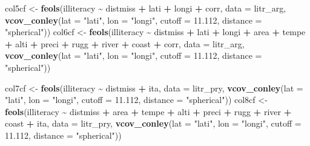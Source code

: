\documentclass[
  a4paper,
]{article}
\newenvironment{Shaded}{\begin{snugshade}}{\end{snugshade}}
\newcommand{\AttributeTok}[1]{\textcolor[rgb]{0.13,0.29,0.53}{#1}}
\newcommand{\FloatTok}[1]{\textcolor[rgb]{0.00,0.00,0.81}{#1}}
\newcommand{\FunctionTok}[1]{\textcolor[rgb]{0.13,0.29,0.53}{\textbf{#1}}}
\newcommand{\NormalTok}[1]{#1}
\newcommand{\OtherTok}[1]{\textcolor[rgb]{0.56,0.35,0.01}{#1}}
\newcommand{\SpecialCharTok}[1]{\textcolor[rgb]{0.81,0.36,0.00}{\textbf{#1}}}
\newcommand{\StringTok}[1]{\textcolor[rgb]{0.31,0.60,0.02}{#1}}
\begin{document}
\begin{Shaded}
\begin{Highlighting}[]
\NormalTok{col5cf }\OtherTok{\textless{}{-}} \FunctionTok{feols}\NormalTok{(illiteracy }\SpecialCharTok{\textasciitilde{}}\NormalTok{ distmiss }\SpecialCharTok{+}\NormalTok{ lati }\SpecialCharTok{+}\NormalTok{ longi }\SpecialCharTok{+}\NormalTok{ corr, }\AttributeTok{data =}\NormalTok{ litr\_arg, }\FunctionTok{vcov\_conley}\NormalTok{(}\AttributeTok{lat =} \StringTok{"lati"}\NormalTok{,}
    \AttributeTok{lon =} \StringTok{"longi"}\NormalTok{, }\AttributeTok{cutoff =} \FloatTok{11.112}\NormalTok{, }\AttributeTok{distance =} \StringTok{"spherical"}\NormalTok{))}
\NormalTok{col6cf }\OtherTok{\textless{}{-}} \FunctionTok{feols}\NormalTok{(illiteracy }\SpecialCharTok{\textasciitilde{}}\NormalTok{ distmiss }\SpecialCharTok{+}\NormalTok{ lati }\SpecialCharTok{+}\NormalTok{ longi }\SpecialCharTok{+}\NormalTok{ area }\SpecialCharTok{+}\NormalTok{ tempe }\SpecialCharTok{+}\NormalTok{ alti }\SpecialCharTok{+}\NormalTok{ preci }\SpecialCharTok{+}
\NormalTok{    rugg }\SpecialCharTok{+}\NormalTok{ river }\SpecialCharTok{+}\NormalTok{ coast }\SpecialCharTok{+}\NormalTok{ corr, }\AttributeTok{data =}\NormalTok{ litr\_arg, }\FunctionTok{vcov\_conley}\NormalTok{(}\AttributeTok{lat =} \StringTok{"lati"}\NormalTok{, }\AttributeTok{lon =} \StringTok{"longi"}\NormalTok{,}
    \AttributeTok{cutoff =} \FloatTok{11.112}\NormalTok{, }\AttributeTok{distance =} \StringTok{"spherical"}\NormalTok{))}

\NormalTok{col7cf }\OtherTok{\textless{}{-}} \FunctionTok{feols}\NormalTok{(illiteracy }\SpecialCharTok{\textasciitilde{}}\NormalTok{ distmiss }\SpecialCharTok{+}\NormalTok{ ita, }\AttributeTok{data =}\NormalTok{ litr\_pry, }\FunctionTok{vcov\_conley}\NormalTok{(}\AttributeTok{lat =} \StringTok{"lati"}\NormalTok{,}
    \AttributeTok{lon =} \StringTok{"longi"}\NormalTok{, }\AttributeTok{cutoff =} \FloatTok{11.112}\NormalTok{, }\AttributeTok{distance =} \StringTok{"spherical"}\NormalTok{))}
\NormalTok{col8cf }\OtherTok{\textless{}{-}} \FunctionTok{feols}\NormalTok{(illiteracy }\SpecialCharTok{\textasciitilde{}}\NormalTok{ distmiss }\SpecialCharTok{+}\NormalTok{ area }\SpecialCharTok{+}\NormalTok{ tempe }\SpecialCharTok{+}\NormalTok{ alti }\SpecialCharTok{+}\NormalTok{ preci }\SpecialCharTok{+}\NormalTok{ rugg }\SpecialCharTok{+}\NormalTok{ river }\SpecialCharTok{+}
\NormalTok{    coast }\SpecialCharTok{+}\NormalTok{ ita, }\AttributeTok{data =}\NormalTok{ litr\_pry, }\FunctionTok{vcov\_conley}\NormalTok{(}\AttributeTok{lat =} \StringTok{"lati"}\NormalTok{, }\AttributeTok{lon =} \StringTok{"longi"}\NormalTok{, }\AttributeTok{cutoff =} \FloatTok{11.112}\NormalTok{,}
    \AttributeTok{distance =} \StringTok{"spherical"}\NormalTok{))}
\end{Highlighting}
\end{Shaded}
\end{document}
